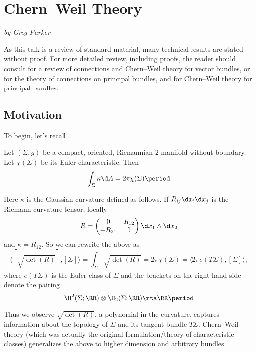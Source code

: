 
\section{Chern--Weil Theory}\label{ChernWeilTheory}
\textit{by Greg Parker}

As this talk is a review of standard material, 
many technical results are stated without proof. 
For more detailed review, including proofs, the reader should consult \cite[Appendix C]{MilnorStasheff} for a review of connections and Chern--Weil theory for vector bundles, 
\cite[Chapter II]{KobayashiNomizu} or \cite[Chapter 2]{JohnRoe} for the theory of connections on principal bundles, and 
\cite[Chapter XII]{KobayashiNomizuII} for Chern--Weil theory for principal bundles.

\subsection{Motivation}

To begin, let's recall
\begin{thm}
	Let $(\Sigma,g)$ be a compact, oriented, Riemannian $ 2 $-manifold without boundary. Let $\chi(\Sigma)$ be its Euler characteristic. 
	Then
	\[
		\int_\Sigma \kappa \d A=2\pi\chi(\Sigma) \period
	\]
\end{thm}
Here $\kappa$ is the Gaussian curvature defined as follows. 
If $R_{ij}\d x_i\d x_j$ is the Riemann curvature tensor, locally
\[R=\begin{pmatrix}
0 & R_{12}\\
-R_{21} & 0
\end{pmatrix} \d x_1\wedge \d x_2\]
and $\kappa= R_{12}$. So we can rewrite the above as
\[
	\langle[\sqrt{\det(R)}],[\Sigma]\rangle=\int_\Sigma\sqrt{\det(R)}=2\pi\chi(\Sigma)=\langle 2\pi e(T\Sigma),[\Sigma]\rangle \comma
\]
where $e(T\Sigma)$ is the Euler class of $\Sigma$ and the brackets on the right-hand side  denote the pairing 
\[
	\H^2(\Sigma;\RR)\otimes \H_2(\Sigma;\RR)\rta\RR\period
\]

Thus we observe $\sqrt{\det(R)}$, a polynomial in the curvature, captures information about the topology of $\Sigma$ and its tangent bundle $T\Sigma$. Chern--Weil theory (which was actually the original formulation/theory of characteristic classes) generalizes the above to higher dimension and arbitrary bundles.

